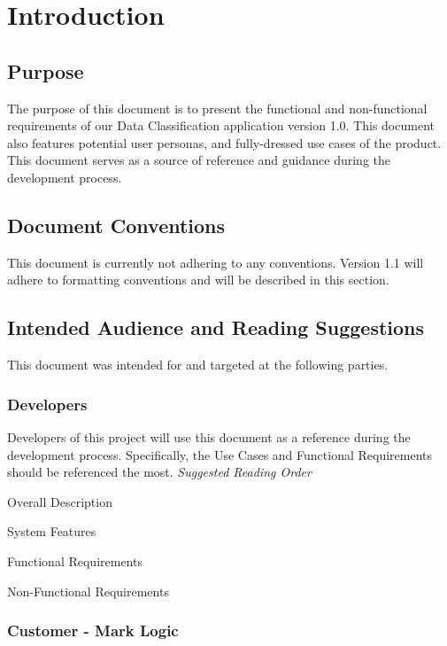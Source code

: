 \documentclass[12pt,oneside,letterpaper]{article}
\newenvironment{packed_enumerate}{ %
\vspace{-7mm}
\begin{enumerate}
  \setlength{\itemsep}{0pt}
  \setlength{\parskip}{0pt}
  \setlength{\parsep}{0pt}
}{\end{enumerate}
\vspace{-8mm}}
\begin{document}
\newpage

\section{Introduction}
\subsection{Purpose}
The purpose of this document is to present the functional and non-functional requirements of our Data Classification application version 1.0. This document also features potential user personas, and fully-dressed use cases of the product. This document serves as a source of reference and guidance during the development process.

\subsection{Document Conventions}
This document is currently not adhering to any conventions. Version 1.1 will adhere to formatting conventions and will be described in this section.

\subsection{Intended Audience and Reading Suggestions}
This document was intended for and targeted at the following parties.
\subsubsection{Developers}
Developers of this project will use this document as a reference during the development process. Specifically, the Use Cases and Functional Requirements should be referenced the most.\newline
\textit{Suggested Reading Order}\newline
\begin{packed_enumerate}
\item Overall Description
\item System Features
\item Functional Requirements
\item Non-Functional Requirements\newline
\end{packed_enumerate}
\subsubsection{Customer - Mark Logic}
\end{document}
